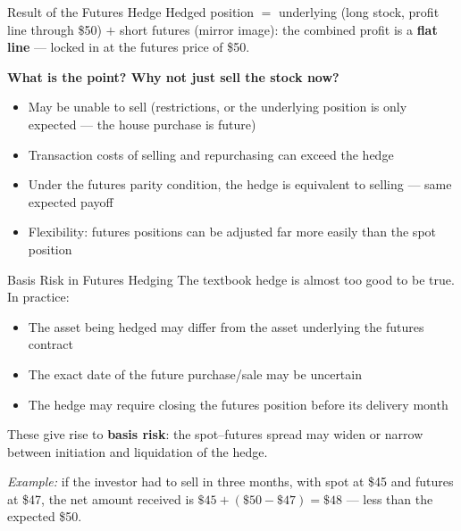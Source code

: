 \documentclass[aspectratio=169]{beamer}
\begin{document}
\begin{frame}{Result of the Futures Hedge}
Hedged position $=$ underlying (long stock, profit line through \$50) $+$ short futures (mirror image): the combined profit is a \textbf{flat line} --- locked in at the futures price of \$50.
\vspace{0.4em}

\textbf{What is the point? Why not just sell the stock now?}
\begin{itemize}
  \item May be unable to sell (restrictions, or the underlying position is only expected --- the house purchase is future)
  \item Transaction costs of selling and repurchasing can exceed the hedge
  \item Under the futures parity condition, the hedge is equivalent to selling --- same expected payoff
  \item Flexibility: futures positions can be adjusted far more easily than the spot position
\end{itemize}
\end{frame}

\begin{frame}{Basis Risk in Futures Hedging}
The textbook hedge is almost too good to be true. In practice:
\begin{itemize}
  \item The asset being hedged may differ from the asset underlying the futures contract
  \item The exact date of the future purchase/sale may be uncertain
  \item The hedge may require closing the futures position before its delivery month
\end{itemize}
\vspace{0.2em}
These give rise to \textbf{basis risk}: the spot--futures spread may widen or narrow between initiation and liquidation of the hedge.
\vspace{0.2em}

\emph{Example:} if the investor had to sell in three months, with spot at \$45 and futures at \$47, the net amount received is $\$45 + (\$50 - \$47) = \$48$ --- less than the expected \$50.
\end{frame}
\end{document}
